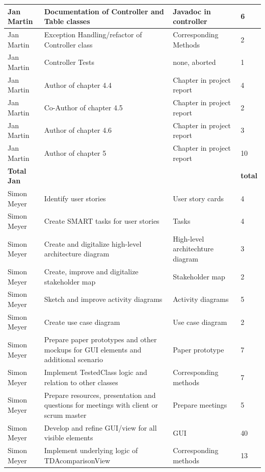 \begin{longtable}{|p{}||p{}|p{}|p{}|}
    \hline  
    Jan Martin & Documentation of Controller and Table classes & Javadoc in controller & 6 \\ 
    \hline    
    Jan Martin & Exception Handling/refactor of Controller class & Corresponding Methods & 2 \\ 
    \hline  
    Jan Martin & Controller Tests & none, aborted & 1 \\ 
    \hline  
    Jan Martin & Author of chapter 4.4 & Chapter in project report & 4 \\ 
    \hline
    Jan Martin & Co-Author of chapter 4.5 & Chapter in project report & 2 \\
    \hline 
    Jan Martin & Author of chapter 4.6 & Chapter in project report & 3 \\ 
    \hline
    Jan Martin & Author of chapter 5 & Chapter in project report & 10 \\ 
    \hline
    \hline 
    \textbf{Total \newline Jan} & & & \textbf{total}   \\
    \hline
    \hline
    Simon Meyer & Identify user stories & User story cards & 4 \\
    \hline
    Simon Meyer& Create SMART tasks for user stories & Tasks & 4 \\
    \hline
    Simon Meyer& Create and digitalize high-level architecture diagram & High-level architechture diagram & 3 \\ 
    \hline
    Simon Meyer& Create, improve and digitalize stakeholder map & Stakeholder map & 2 \\ 
    \hline
    Simon Meyer& Sketch and improve activity diagrams & Activity diagrams & 5 \\ 
    \hline
    Simon Meyer& Create use case diagram & Use case diagram & 2 \\ 
    \hline
    Simon Meyer& Prepare paper prototypes and other mockups for GUI elements and additional scenario & Paper prototype & 7 \\
    \hline
    Simon Meyer& Implement TestedClass logic and relation to other classes & Corresponding methods & 7 \\ 
    \hline
    Simon Meyer& Prepare resources, presentation and questions for meetings with client or scrum master & Prepare meetings & 5 \\ 
    \hline
    Simon Meyer& Develop and refine GUI/view for all visible elements & GUI & 40 \\ 
    \hline
    Simon Meyer& Implement underlying logic of TDAcomparisonView & Corresponding methods & 13 \\ 

\end{longtable}
